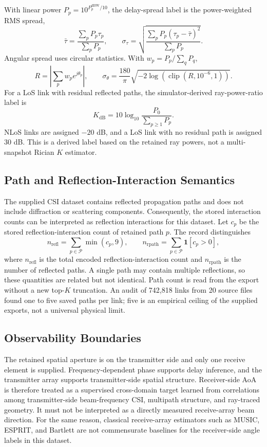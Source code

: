 With linear power $P_p=10^{P_p^{\mathrm{dBW}}/10}$, the delay-spread label is the power-weighted
RMS spread,
\[
\bar\tau=\frac{\sum_pP_p\tau_p}{\sum_pP_p},
\qquad
\sigma_\tau=\sqrt{\frac{\sum_pP_p(\tau_p-\bar\tau)^2}{\sum_pP_p}}.
\]
Angular spread uses circular statistics. With $w_p=P_p/\sum_qP_q$,
\[
R=\left|\sum_pw_pe^{j\theta_p}\right|,
\qquad
\sigma_\theta=\frac{180}{\pi}\sqrt{-2\log(\operatorname{clip}(R,10^{-6},1))}.
\]
For a LoS link with residual reflected paths, the simulator-derived ray-power-ratio label is
\[
K_{\mathrm{dB}}=10\log_{10}\frac{P_0}{\sum_{p\geq1}P_p}.
\]
NLoS links are assigned $-20$ dB, and a LoS link with no residual path is assigned 30 dB. This is
a derived label based on the retained ray powers, not a multi-snapshot Rician $K$ estimator.

\subsection{Path and Reflection-Interaction Semantics}

The supplied CSI dataset contains reflected propagation paths and does not include diffraction or
scattering components. Consequently, the stored interaction counts can be interpreted as reflection
interactions for this dataset. Let $c_p$ be the stored reflection-interaction count of retained path $p$.
The record distinguishes
\[
n_{\mathrm{refl}}=\sum_{p\in\mathcal P}\min(c_p,9),
\qquad
n_{\mathrm{rpath}}=\sum_{p\in\mathcal P}\mathbf 1[c_p>0],
\]
where $n_{\mathrm{refl}}$ is the total encoded reflection-interaction count and
$n_{\mathrm{rpath}}$ is the number of reflected paths. A single path may contain multiple reflections,
so these quantities are related but not identical. Path count is read from the export without a new
top-$K$ truncation. An audit of 742,818 links from 20 source files found one to five saved paths per
link; five is an empirical ceiling of the supplied exports, not a universal physical limit.

\subsection{Observability Boundaries}

The retained spatial aperture is on the transmitter side and only one receive element is supplied.
Frequency-dependent phase supports delay inference, and the transmitter array supports
transmitter-side spatial structure. Receiver-side AoA is therefore treated as a supervised
cross-domain target learned from correlations among transmitter-side beam-frequency CSI, multipath
structure, and ray-traced geometry. It must not be interpreted as a directly measured receive-array
beam direction. For the same reason, classical receive-array estimators such as MUSIC, ESPRIT, and
Bartlett are not commensurate baselines for the receiver-side angle labels in this dataset.

